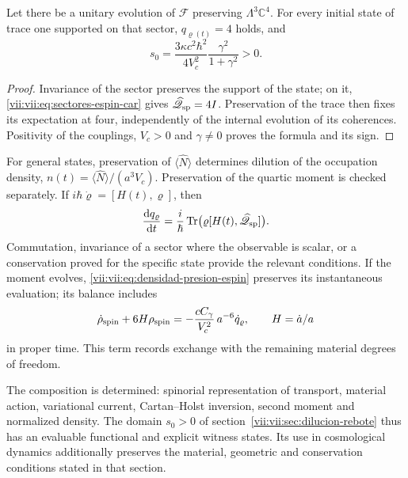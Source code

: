 \begin{corollary}
\label{vii:vii:cor:dominio-positivo-conservado}
Let there be a unitary evolution of \(\mathcal F\) preserving
\(\Lambda^3\mathbb C^4\). For every initial state of trace one
supported on that sector, \(q_{\varrho(t)}=4\) holds, and
\begin{equation}
 s_0=\frac{3\kappa c^2\hbar^2}{4V_c^2}
                   \frac{\gamma^2}{1+\gamma^2}>0.
 \label{vii:vii:eq:amplitud-positiva-sector-tres}
\end{equation}
\end{corollary}
\begin{proof}
Invariance of the sector preserves the support of the state; on it,
\eqref{vii:vii:eq:sectores-espin-car} gives
\(\widehat{\mathscr Q}_{\rm sp}=4I\). Preservation of the
trace then fixes its expectation at four, independently of
the internal evolution of its coherences. Positivity of the
couplings, \(V_c>0\) and \(\gamma\ne0\) proves the formula
and its sign.
\end{proof}

For general states, preservation of
\(\langle\widehat N\rangle\) determines dilution of the occupation
density, \(n(t)=\langle\widehat N\rangle/(a^3V_c)\).
Preservation of the quartic moment is checked separately.
If \(i\hbar\dot\varrho=[H(t),\varrho]\), then
\begin{equation}
 \frac{\mathrm d q_\varrho}{\mathrm dt}
 =\frac{i}{\hbar}\operatorname{Tr}
       \bigl(\varrho[H(t),\widehat{\mathscr Q}_{\rm sp}]\bigr).
 \label{vii:vii:eq:conservacion-momento-cuartico}
\end{equation}
Commutation, invariance of a sector where the observable is
scalar, or a conservation proved for the specific state
provide the relevant conditions. If the moment evolves,
\eqref{vii:vii:eq:densidad-presion-espin} preserves its instantaneous
evaluation; its balance includes
\[
 \dot\rho_{\rm spin}+6H\rho_{\rm spin}
 =-\frac{cC_\gamma}{V_c^2}\,a^{-6}\dot q_\varrho,
 \qquad H=\dot a/a
\]
in proper time. This term records exchange with the
remaining material degrees of freedom.

The composition is determined: spinorial representation of
transport, material action, variational current, Cartan--Holst
inversion, second moment and normalized density. The domain
\(s_0>0\) of section~\ref{vii:vii:sec:dilucion-rebote} thus has
an evaluable functional and explicit witness states. Its use in
cosmological dynamics additionally preserves the material,
geometric and conservation conditions stated in that section.

